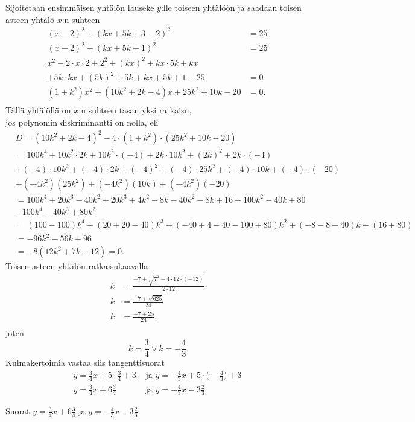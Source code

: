 \begin{esimerkki}
\begin{esimratk}
Sijoitetaan ensimmäisen yhtälön lauseke $y$:lle toiseen yhtälöön ja saadaan toisen asteen yhtälö $x$:n suhteen
\begin{align*}
(x-2)^2+(kx+5k+3-2)^2&=25 \\
(x-2)^2+(kx+5k+1)^2&=25 \\
x^2-2\cdot x\cdot 2 +2^2+(kx)^2+kx\cdot 5k+kx&\\
+5k\cdot kx+(5k)^2+5k+kx+5k+1-25& =0 \\
(1+k^2)x^2+(10k^2+2k-4)x+25k^2+10k-20& = 0. \\
\end{align*}
Tällä yhtälöllä on $x$:n suhteen tasan yksi ratkaisu, \\ jos polynomin diskriminantti on nolla, eli
\begin{align*}
& D = (10k^2+2k-4)^2-4\cdot(1+k^2)\cdot(25k^2+10k-20) \\ 
&= 100k^4+10k^2\cdot 2k+10k^2\cdot (-4) +2k\cdot 10k^2+(2k)^2+2k\cdot (-4) \\
& +(-4)\cdot 10k^2+(-4)\cdot 2k+(-4)^2+(-4)\cdot 25k^2+(-4)\cdot 10k+(-4)\cdot (-20) \\
& +(-4k^2)(25k^2)+(-4k^2)(10k)+(-4k^2)(-20) \\
& = 100k^4+20k^3-40k^2+20k^3+4k^2-8k-40k^2-8k+16-100k^2-40k+80 \\
& -100k^4-40k^3+80k^2 \\
& = (100-100)k^4+(20+20-40)k^3+(-40+4-40-100+80)k^2+(-8-8-40)k+(16+80) \\
& = -96k^2-56k+96 \\
&=-8(12k^2+7k-12) = 0.
\end{align*}
Toisen asteen yhtälön ratkaisukaavalla
\begin{align*}
k &= \frac{-7\pm \sqrt{7^2-4\cdot 12\cdot (-12)}}{2\cdot 12} \\
k &= \frac{-7\pm \sqrt{625}}{24} \\
k &= \frac{-7\pm 25 }{24}, \\
\end{align*}
joten
\[
k =  \frac{3}{4} \vee k = -\frac{4}{3}
\]
Kulmakertoimia vastaa siis tangenttisuorat
\begin{align*}
y = \frac{3}{4}x+5\cdot \frac{3}{4}+3 &\textrm{  ja  } y = -\frac{4}{3}x+5\cdot \Big(-\frac{4}{3}\Big)+3 \\
y = \frac{3}{4}x+6\frac{3}{4} &\textrm{  ja  } y = -\frac{4}{3}x-3\frac{2}{3}
\end{align*}

\begin{esimvast}
Suorat $y = \frac{3}{4}x+6\frac{3}{4}$ ja $y = -\frac{4}{3}x-3\frac{2}{3}$
\end{esimvast}
\end{esimratk}
\end{esimerkki}


